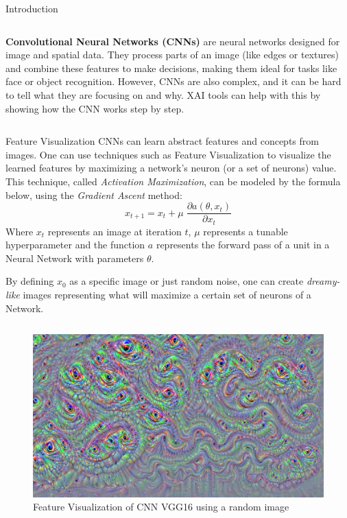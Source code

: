 \documentclass[final]{beamer}
\newlength{\colwidth}
\begin{document}
\begin{frame}[t]
\begin{columns}[t]
\begin{column}{\colwidth}
\begin{block}{Introduction}
\begin{columns}
      \begin{column}{0.4\textwidth}        
        
        \textbf{Convolutional Neural Networks (CNNs)} are neural networks designed for image and spatial data. They process parts of an image (like edges or textures) and combine these features to make decisions, making them ideal for tasks like face or object recognition.
        However, CNNs are also complex, and it can be hard to tell what they are focusing on and why. 
        XAI tools can help with this by showing how the CNN works step by step.
      \end{column}
    
    \end{columns}
  \end{block}

  \begin{block}{Feature Visualization}
    CNNs can learn abstract features and concepts from images. 
    One can use techniques such as Feature Visualization to visualize the learned features by maximizing a network's neuron (or a set of neurons) value.
    This technique, called \emph{Activation Maximization}, can be modeled by the formula below, using the \emph{Gradient Ascent} method:
    \[x_{t + 1} = x_{t} + \mu \;\frac{\partial a(\theta, x_t)}{\partial x_t}\]
    Where \(x_t\) represents an image at iteration \(t\), \(\mu\) represents a tunable hyperparameter and the function \(a\) represents the forward pass of a unit in a Neural Network with parameters \(\theta\).
    
    By defining \(x_0\) as a specific image or just random noise, one can create \emph{dreamy-like} \cite{deepdream} images representing what will maximize a certain set of neurons of a Network.
    \begin{columns}  
      \begin{column}{0.5\textwidth}
        \begin{figure}
          \centering
          \includegraphics[width=\linewidth]{images/random_image_dream.png}
          \caption{Feature Visualization of CNN VGG16 using a random image}
        \end{figure}  
      \end{column}


\end{columns}
\end{block}
\end{column}
\end{columns}
\end{frame}
\end{document}
